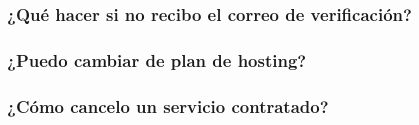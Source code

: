 \subsubsection*{¿Qué hacer si no recibo el correo de verificación?}

\subsubsection*{¿Puedo cambiar de plan de hosting?}

\subsubsection*{¿Cómo cancelo un servicio contratado?}
